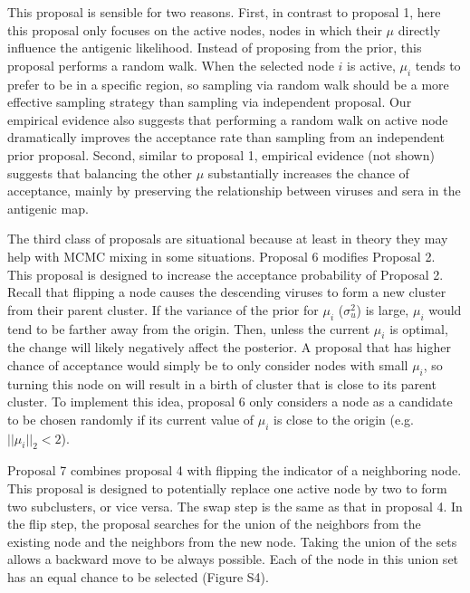 \documentclass[11pt,oneside,letterpaper]{article}
\begin{document}
This proposal is sensible for two reasons.
First, in contrast to proposal 1, here this proposal only focuses on the active nodes, nodes in which their $\mu$ directly influence the antigenic likelihood.
Instead of proposing from the prior, this proposal performs a random walk.
When the selected node $i$ is active, $\mu_i$ tends to prefer to be in a specific region, so sampling via random walk should be a more effective sampling strategy than sampling via independent proposal.
Our empirical evidence also suggests that performing a random walk on active node dramatically improves the acceptance rate than sampling from an independent prior proposal.
Second, similar to proposal 1, empirical evidence (not shown) suggests that balancing the other $\mu$ substantially increases the chance of acceptance, mainly by preserving the relationship between viruses and sera in the antigenic map.


The third class of proposals are situational because at least in theory they may help with MCMC mixing in some situations.
Proposal 6 modifies Proposal 2. 
This proposal is designed to increase the acceptance probability of Proposal 2. 
Recall that flipping a node causes the descending viruses to form a new cluster from their parent cluster.
If the variance of the prior for $\mu_i$ ($\sigma^2_u$) is large, $\mu_i$ would tend to be farther away from the origin. 
Then, unless the current $\mu_i$ is optimal, the change will likely negatively affect the posterior.  
A proposal that has higher chance of acceptance would simply be to only consider nodes with small $\mu_i$, so turning this node on will result in a birth of cluster that is close to its parent cluster.
To implement this idea, proposal 6 only considers a node as a candidate to be chosen randomly if its current value of $\mu_i$ is close to the origin (e.g. $ || \mu_i ||_2  < 2$).


Proposal 7 combines proposal 4 with flipping the indicator of a neighboring node. 
This proposal is designed to potentially replace one active node by two to form two subclusters, or vice versa.
The swap step is the same as that in proposal 4.
In the flip step, the proposal searches for the union of the neighbors from the existing node and the neighbors from the new node.
Taking the union of the sets allows a backward move to be always possible.
Each of the node in this union set has an equal chance to be selected (Figure S4).
\end{document}
